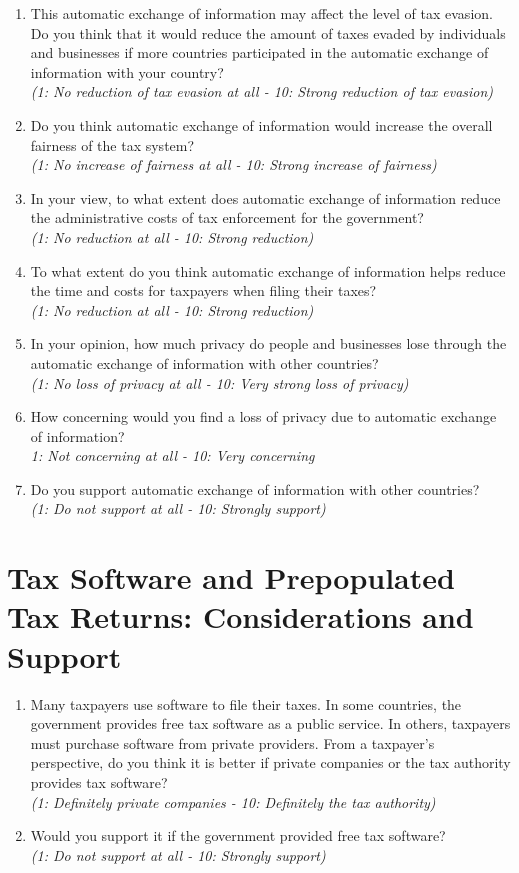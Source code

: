 \documentclass[11pt]{article}
\begin{document}
\begin{enumerate}[resume]
    \item This automatic exchange of information may affect the level of tax evasion. Do you think that it would reduce the amount of taxes evaded by individuals and businesses if more countries participated in the automatic exchange of information with your country?\\
    \textit{(1: No reduction of tax evasion at all - 10: Strong reduction of tax evasion)} 
    \item Do you think automatic exchange of information would increase the overall fairness of the tax system? \\
    \textit{(1: No increase of fairness at all - 10: Strong increase of fairness)} 
    \item In your view, to what extent does automatic exchange of information reduce the administrative costs of tax enforcement for the government?\\
\textit{(1: No reduction at all - 10: Strong reduction)}
    \item To what extent do you think automatic exchange of information helps reduce the time and costs for taxpayers when filing their taxes?\\
\textit{(1: No reduction at all - 10: Strong reduction)}
    \item In your opinion, how much privacy do people and businesses lose through the automatic exchange of information  with other countries? \\
    \textit{(1: No loss of privacy at all - 10: Very strong loss of privacy)} 
    \item How concerning would you find a loss of privacy due to automatic exchange of information? \\ 
    \textit{1: Not concerning at all - 10: Very concerning}
    \item Do you support automatic exchange of information with other countries? \\
    \textit{(1: Do not support at all - 10: Strongly support)}
\end{enumerate}
\section*{Tax Software and Prepopulated Tax Returns: Considerations and Support} 
\begin{enumerate}[resume]
    \item Many taxpayers use software to file their taxes. In some countries, the government provides free tax software as a public service. In others, taxpayers must purchase software from private providers. From a taxpayer’s perspective, do you think it is better if private companies or the tax authority provides tax software? \\
    \textit{(1: Definitely private companies - 10: Definitely the tax authority)}
    \item Would you support it if the government provided free tax software?\\
    \textit{(1: Do not support at all - 10: Strongly support)}
\end{enumerate}
\end{document}
